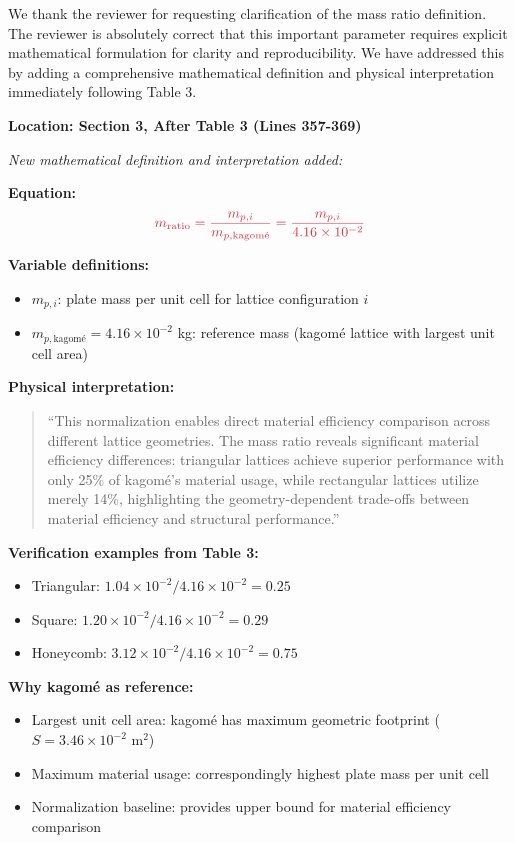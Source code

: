 \documentclass[11pt,a4paper]{article}
\newenvironment{responsebox}{%
    \par\medskip\noindent{\color{responsecolor}\rule{\linewidth}{2pt}}\par
    \noindent{\color{responsecolor}\bfseries Response}\par\smallskip
}{%
    \par\noindent{\color{responsecolor}\rule{\linewidth}{0.5pt}}\medskip
}
\newenvironment{changesbox}{%
    \par\medskip\noindent{\color{changescolor}\rule{\linewidth}{2pt}}\par
    \noindent{\color{changescolor}\bfseries Manuscript Changes}\par\smallskip
}{%
    \par\noindent{\color{changescolor}\rule{\linewidth}{0.5pt}}\medskip
}
\begin{document}
\begin{responsebox}
We thank the reviewer for requesting clarification of the mass ratio definition. The reviewer is absolutely correct that this important parameter requires explicit mathematical formulation for clarity and reproducibility. We have addressed this by adding a comprehensive mathematical definition and physical interpretation immediately following Table 3.
\end{responsebox}

\begin{changesbox}
\textbf{Location: Section 3, After Table 3 (Lines 357-369)}

\textit{New mathematical definition and interpretation added:}

\textbf{Equation:}
\begin{equation}
\textcolor{redtext}{m_{\text{ratio}} = \frac{m_{p,i}}{m_{p,\text{kagomé}}} = \frac{m_{p,i}}{4.16 \times 10^{-2}}}
\end{equation}

\textbf{Variable definitions:}
\begin{itemize}
    \item $m_{p,i}$: plate mass per unit cell for lattice configuration $i$
    \item $m_{p,\text{kagomé}} = 4.16 \times 10^{-2}$ kg: reference mass (kagomé lattice with largest unit cell area)
\end{itemize}

\textbf{Physical interpretation:}
\begin{quote}
\textcolor{redtext}{``This normalization enables direct material efficiency comparison across different lattice geometries. The mass ratio reveals significant material efficiency differences: triangular lattices achieve superior performance with only 25\% of kagomé's material usage, while rectangular lattices utilize merely 14\%, highlighting the geometry-dependent trade-offs between material efficiency and structural performance.''}
\end{quote}

\textbf{Verification examples from Table 3:}
\begin{itemize}
    \item Triangular: $1.04 \times 10^{-2} / 4.16 \times 10^{-2} = 0.25$ \checkmark
    \item Square: $1.20 \times 10^{-2} / 4.16 \times 10^{-2} = 0.29$ \checkmark
    \item Honeycomb: $3.12 \times 10^{-2} / 4.16 \times 10^{-2} = 0.75$ \checkmark
\end{itemize}

\textbf{Why kagomé as reference:}
\begin{itemize}
    \item Largest unit cell area: kagomé has maximum geometric footprint ($S = 3.46 \times 10^{-2}$ m$^2$)
    \item Maximum material usage: correspondingly highest plate mass per unit cell
    \item Normalization baseline: provides upper bound for material efficiency comparison
\end{itemize}
\end{changesbox}
\end{document}
